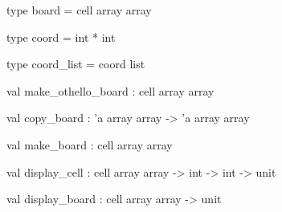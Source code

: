 \documentclass[11pt]{article}
\begin{document}
\label{type:Othello.board}\begin{ocamldoccode}
type board = cell array array 
\end{ocamldoccode}




\label{type:Othello.coord}\begin{ocamldoccode}
type coord = int * int 
\end{ocamldoccode}




\label{type:Othello.coord-underscorelist}\begin{ocamldoccode}
type coord_list = coord list 
\end{ocamldoccode}




\label{val:Othello.make-underscoreothello-underscoreboard}\begin{ocamldoccode}
val make_othello_board : cell array array
\end{ocamldoccode}




\label{val:Othello.copy-underscoreboard}\begin{ocamldoccode}
val copy_board : 'a array array -> 'a array array
\end{ocamldoccode}




\label{val:Othello.make-underscoreboard}\begin{ocamldoccode}
val make_board : cell array array
\end{ocamldoccode}




\label{val:Othello.display-underscorecell}\begin{ocamldoccode}
val display_cell : cell array array -> int -> int -> unit
\end{ocamldoccode}




\label{val:Othello.display-underscoreboard}\begin{ocamldoccode}
val display_board : cell array array -> unit
\end{ocamldoccode}
\end{document}
